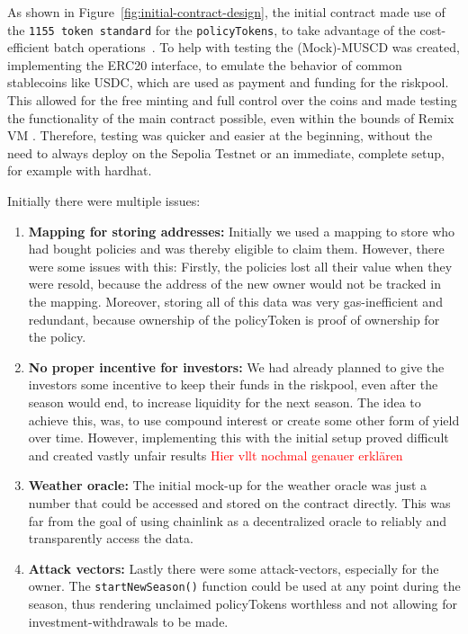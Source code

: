 \documentclass[11pt,a4paper]{article}
\begin{document}
	As shown in Figure~\ref{fig:initial-contract-design}, the initial contract made use of the \texttt{1155 token standard} for the \texttt{policyTokens}, to take advantage of the cost-efficient batch operations~\parencite{ERC1155}.
	To help with testing the (Mock)-MUSCD was created, implementing the ERC20 interface, to emulate the behavior of common stablecoins like USDC, which are used as payment and funding for the riskpool.
	This allowed for the free minting and full control over the coins and made testing the functionality of the main contract possible, even within the bounds of Remix VM .
	Therefore, testing was quicker and easier at the beginning, without the need to always deploy on the Sepolia Testnet or an immediate, complete setup, for example with hardhat.

	Initially there were multiple issues:
	\begin{enumerate}[1]
		\item \textbf{Mapping for storing addresses:} Initially we used a mapping to store who had bought policies and was thereby eligible to claim them.
			However, there were some issues with this: Firstly, the policies lost all their value when they were resold, because the address of the new owner would not be tracked in the mapping.
			Moreover, storing all of this data was very gas-inefficient and redundant, because ownership of the policyToken is proof of ownership for the policy.
		\item \textbf{No proper incentive for investors:} We had already planned to give the investors some incentive to keep their funds in the riskpool, even after the season would end, to increase liquidity for the next season.
			The idea to achieve this, was, to use compound interest or create some other form of yield over time.
			However, implementing this with the initial setup proved difficult and created vastly unfair results \textcolor{red}{Hier vllt nochmal genauer erkl\"aren}
		\item \textbf{Weather oracle:} The initial mock-up for the weather oracle was just a number that could be accessed and stored on the contract directly.
			This was far from the goal of using chainlink as a decentralized oracle to reliably and transparently access the data.
		\item \textbf{Attack vectors:} Lastly there were some attack-vectors, especially for the owner.
			The \texttt{startNewSeason()} function could be used at any point during the season, thus rendering unclaimed policyTokens worthless and not allowing for investment-withdrawals to be made.
	\end{enumerate}
\end{document}
